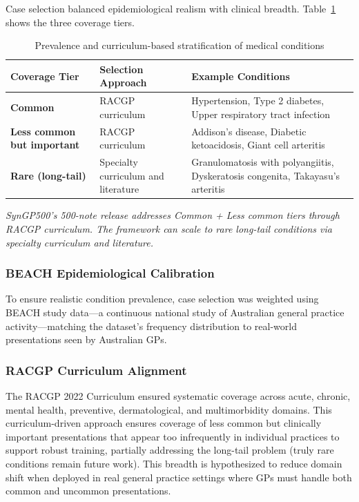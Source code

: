 \documentclass[11pt]{article}
\begin{document}
Case selection balanced epidemiological realism with clinical breadth. Table~\ref{tab:coverage-tiers} shows the three coverage tiers.

\begin{table}[ht]
\centering
\caption{Prevalence and curriculum-based stratification of medical conditions}
\label{tab:coverage-tiers}
\begin{tabular}{p{3.5cm}p{4cm}p{6cm}}
\toprule
\textbf{Coverage Tier} & \textbf{Selection Approach} & \textbf{Example Conditions} \\
\midrule
\textbf{Common} & RACGP curriculum & Hypertension, Type 2 diabetes, Upper respiratory tract infection \\
\addlinespace
\textbf{Less common but important} & RACGP curriculum & Addison's disease, Diabetic ketoacidosis, Giant cell arteritis \\
\addlinespace
\textbf{Rare (long-tail)} & Specialty curriculum and literature & Granulomatosis with polyangiitis, Dyskeratosis congenita, Takayasu's arteritis \\
\bottomrule
\end{tabular}
\vspace{0.3cm}

\noindent\small\textit{SynGP500's 500-note release addresses Common + Less common tiers through RACGP curriculum. The framework can scale to rare long-tail conditions via specialty curriculum and literature.}
\end{table}

\subsubsection{BEACH Epidemiological Calibration}

To ensure realistic condition prevalence, case selection was weighted using BEACH study \cite{beach} data—a continuous national study of Australian general practice activity—matching the dataset's frequency distribution to real-world presentations seen by Australian GPs.

\subsubsection{RACGP Curriculum Alignment}

The RACGP 2022 Curriculum \cite{racgp} ensured systematic coverage across acute, chronic, mental health, preventive, dermatological, and multimorbidity domains. This curriculum-driven approach ensures coverage of less common but clinically important presentations that appear too infrequently in individual practices to support robust training, partially addressing the long-tail problem (truly rare conditions remain future work). This breadth is hypothesized to reduce domain shift when deployed in real general practice settings where GPs must handle both common and uncommon presentations.
\end{document}

